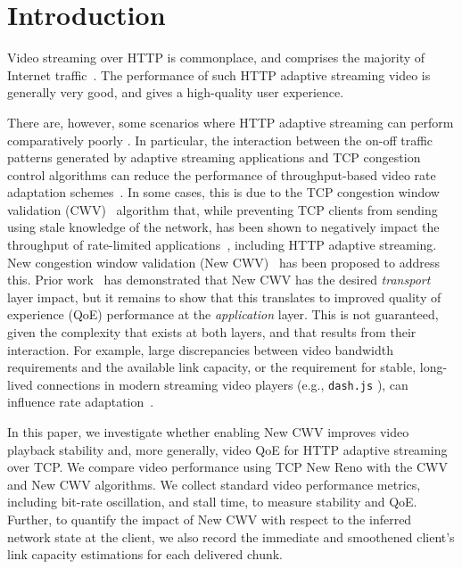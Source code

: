 \documentclass[10pt,sigconf]{acmart}
\begin{document}
\section{Introduction}
\label{sec:introduction}

Video streaming over HTTP is commonplace, and comprises the majority of Internet traffic~\cite{Sandvine-2019-global-internet-report}. The performance of such HTTP adaptive streaming video is generally very good, and gives a high-quality user experience.
  
There are, however, some scenarios where HTTP adaptive streaming can perform comparatively poorly \cite{Spiteri-2016-BOLA,Kua-2017-a-survey-rate-adaptation-dash}. In particular, the interaction between the on-off traffic patterns generated by adaptive streaming applications and TCP congestion control algorithms can reduce the performance of throughput-based video rate adaptation schemes~\cite{Akhshabi-2012-http-adaptive-players-compete,Stohr-2017-where-are-the-sweet-spots-maci}. In some cases, this is due to the TCP congestion window validation (CWV)~\cite{rfc2861-2000-padhye-congestion-window-validation} algorithm that, while preventing TCP clients from sending using stale knowledge of the network, has been shown to negatively impact the throughput of rate-limited applications~\cite{Nazir-2014-performance-evaluation-congestion-window-validation-dash-newcwv}, including HTTP adaptive streaming. New congestion window validation (New CWV)~\cite{rfc7661-2015-fairhurst-new-cwnd-validation} has been proposed to address this. Prior work~\cite{Nazir-2014-performance-evaluation-congestion-window-validation-dash-newcwv} has demonstrated that New CWV has the desired \emph{transport} layer impact, but it remains to show that this translates to improved quality of experience (QoE) performance at the \emph{application} layer. This is not guaranteed, given the complexity that exists at both layers, and that results from their interaction. For example, large discrepancies between video bandwidth requirements and the available link capacity, or the requirement for stable, long-lived connections in modern streaming video players (e.g., \texttt{dash.js} \cite{online-dashjs}), can influence rate adaptation~\cite{Spiteri-2019-from-theory-to-practice-sabre}.

In this paper, we investigate whether enabling New CWV improves video playback stability and, more generally, video QoE for HTTP adaptive streaming over TCP. We compare video performance using TCP New Reno with the CWV and New CWV algorithms. We collect standard video performance metrics, including bit-rate oscillation, and stall time, to measure stability and QoE. Further, to quantify the impact of New CWV with respect to the inferred network state at the client, we also record the immediate and smoothened client's link capacity estimations for each delivered chunk.
\end{document}

